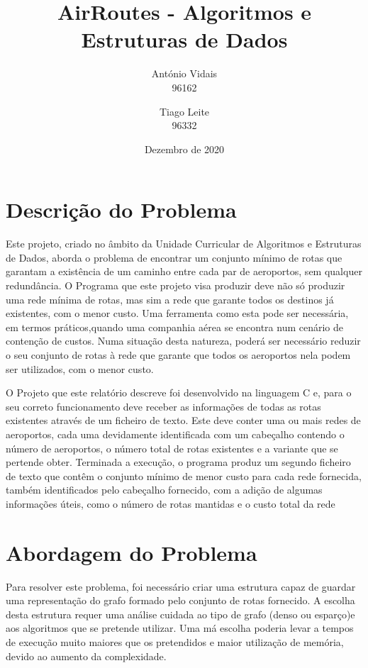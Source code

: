 \documentclass[14pt]{article}
\title{AirRoutes - Algoritmos e Estruturas de Dados}
\date{Dezembro de 2020}
\author{António Vidais \\96162 \and Tiago Leite \\96332}
\begin{document}
    \maketitle

    \section{Descrição do Problema} \label{sec:d.problema}
    Este projeto, criado no âmbito da Unidade Curricular de Algoritmos e Estruturas de Dados, aborda o problema de
    encontrar um conjunto mínimo de rotas que garantam a existência de um caminho entre cada par de aeroportos,
    sem qualquer redundância.
    O Programa que este projeto visa produzir deve não só produzir uma rede mínima de rotas, mas sim a rede que garante
    todos os destinos já existentes, com o menor custo.
    Uma ferramenta como esta pode ser necessária, em termos práticos,quando uma companhia aérea se encontra num cenário
    de contenção de custos.
    Numa situação desta natureza, poderá ser necessário reduzir o seu conjunto de rotas à rede que
    garante que todos os aeroportos nela podem ser utilizados, com o menor custo.

    O Projeto que este relatório descreve foi desenvolvido na linguagem C e, para o seu correto funcionamento deve
    receber as informações de todas as rotas existentes através de um ficheiro de texto.
    Este deve conter uma ou mais redes de aeroportos, cada uma devidamente identificada com um cabeçalho contendo o
    número de aeroportos, o número total de rotas existentes e a variante que se pertende obter.
    Terminada a execução, o programa produz um segundo ficheiro de texto que contêm o conjunto mínimo de menor custo
    para cada rede fornecida, também identificados pelo cabeçalho fornecido, com a adição de algumas informações úteis,
    como o número de rotas mantidas e o custo total da rede

    \section{Abordagem do Problema}\label{sec:abordagem.problema}
    Para resolver este problema, foi necessário criar uma estrutura capaz de guardar uma representação do grafo formado
    pelo conjunto de rotas fornecido.
    A escolha desta estrutura requer uma análise cuidada ao tipo de grafo (denso ou esparço)e aos algoritmos que se
    pretende utilizar.
    Uma má escolha poderia levar a tempos de execução muito maiores que os pretendidos e maior utilização de memória,
    devido ao aumento da complexidade.
\end{document}
